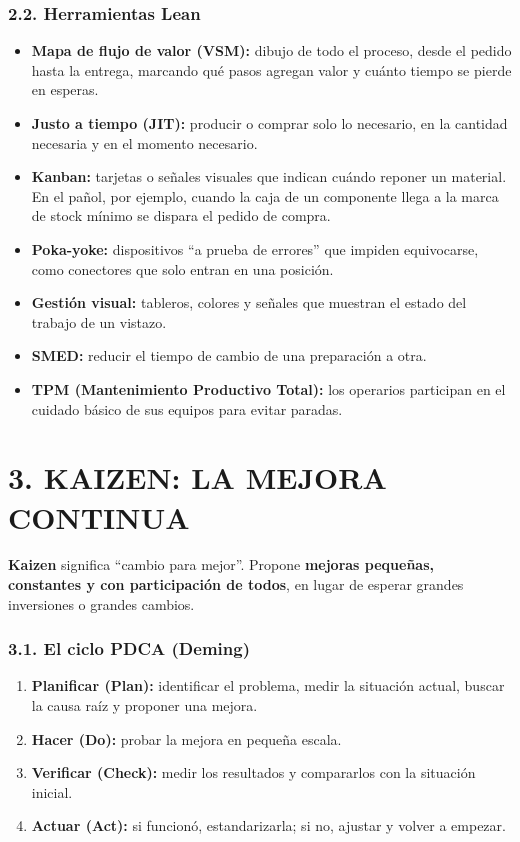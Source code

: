 \subsubsection*{2.2. Herramientas Lean}
\begin{itemize}
  \item \textbf{Mapa de flujo de valor (VSM):} dibujo de todo el proceso, desde el pedido hasta
        la entrega, marcando qué pasos agregan valor y cuánto tiempo se pierde en esperas.
  \item \textbf{Justo a tiempo (JIT):} producir o comprar solo lo necesario, en la cantidad
        necesaria y en el momento necesario.
  \item \textbf{Kanban:} tarjetas o señales visuales que indican cuándo reponer un material. En
        el pañol, por ejemplo, cuando la caja de un componente llega a la marca de stock
        mínimo se dispara el pedido de compra.
  \item \textbf{Poka-yoke:} dispositivos ``a prueba de errores'' que impiden equivocarse, como
        conectores que solo entran en una posición.
  \item \textbf{Gestión visual:} tableros, colores y señales que muestran el estado del trabajo
        de un vistazo.
  \item \textbf{SMED:} reducir el tiempo de cambio de una preparación a otra.
  \item \textbf{TPM (Mantenimiento Productivo Total):} los operarios participan en el cuidado
        básico de sus equipos para evitar paradas.
\end{itemize}

\section*{3. KAIZEN: LA MEJORA CONTINUA}

\textbf{Kaizen} significa ``cambio para mejor''. Propone \textbf{mejoras pequeñas, constantes y
con participación de todos}, en lugar de esperar grandes inversiones o grandes cambios.

\subsubsection*{3.1. El ciclo PDCA (Deming)}
\begin{enumerate}
  \item \textbf{Planificar (Plan):} identificar el problema, medir la situación actual, buscar
        la causa raíz y proponer una mejora.
  \item \textbf{Hacer (Do):} probar la mejora en pequeña escala.
  \item \textbf{Verificar (Check):} medir los resultados y compararlos con la situación inicial.
  \item \textbf{Actuar (Act):} si funcionó, estandarizarla; si no, ajustar y volver a empezar.
\end{enumerate}

